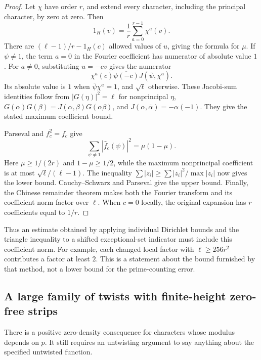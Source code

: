 \documentclass[11pt]{article}
\theoremstyle{definition}
\theoremstyle{remark}
\begin{document}
\begin{proof}
Let \(\chi\) have order \(r\), and extend every character, including
the principal character, by zero at zero. Then
\[
 1_H(v)=\frac1r\sum_{a=0}^{r-1}\chi^a(v).
\]
There are \((\ell-1)/r-1_H(c)\) allowed values of \(u\), giving
the formula for \(\mu\). If \(\psi\ne1\), the term \(a=0\) in the
Fourier coefficient has numerator of absolute value \(1\).
For \(a\ne0\), substituting \(u=-cv\) gives the numerator
\[
 \chi^a(c)\overline{\psi(-c)}
 J(\overline\psi,\chi^a).
\]
Its absolute value is \(1\) when \(\overline\psi\chi^a=1\), and
\(\sqrt\ell\) otherwise. These Jacobi-sum identities follow from
\(|G(\eta)|^2=\ell\) for nonprincipal \(\eta\),
\(G(\alpha)G(\beta)=J(\alpha,\beta)G(\alpha\beta)\), and
\(J(\alpha,\overline\alpha)=-\alpha(-1)\).
They give the stated maximum coefficient bound.

Parseval and \(f_c^2=f_c\) give
\[
 \sum_{\psi\ne1}|\widehat f_c(\psi)|^2=\mu(1-\mu).
\]
Here \(\mu\geq1/(2r)\) and \(1-\mu\geq1/2\), while
the maximum nonprincipal coefficient is at most
\(\sqrt\ell/(\ell-1)\).
The inequality
\(\sum |z_i|\geq\sum|z_i|^2/\max|z_i|\) now gives the
lower bound. Cauchy--Schwarz and Parseval give the upper bound.
Finally, the Chinese remainder theorem makes both the Fourier
transform and its coefficient norm factor over \(\ell\).
When \(c=0\) locally, the original expansion has \(r\)
coefficients equal to \(1/r\).
\end{proof}

Thus an estimate obtained by applying individual Dirichlet bounds
and the triangle inequality to a shifted exceptional-set indicator
must include this coefficient norm. For example, each changed
local factor with \(\ell\geq256r^2\) contributes a factor at least
\(2\). This is a statement about the bound furnished by that method,
not a lower bound for the prime-counting error.

\subsection{A large family of twists with finite-height zero-free strips}

There is a positive zero-density consequence for characters whose
modulus depends on \(p\). It still requires an untwisting argument
to say anything about the specified untwisted function.
\end{document}
